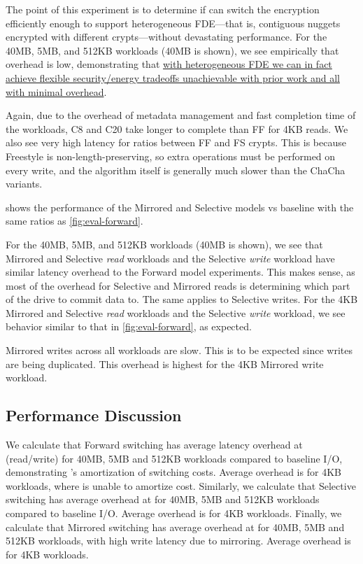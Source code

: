 

The point of this experiment is to determine if \sys can switch the encryption
efficiently enough to support heterogeneous FDE---that is, contiguous nuggets
encrypted with different crypts---without devastating performance. For the 40MB,
5MB, and 512KB workloads (40MB is shown), we see empirically that overhead is
low, demonstrating that \uline{with heterogeneous FDE we can in fact achieve
flexible security/energy tradeoffs unachievable with prior work and all with
minimal overhead}.

Again, due to the overhead of metadata management and fast completion time of
the workloads, C8 and C20 take longer to complete than FF for 4KB reads. We also
see very high latency for ratios between FF and FS crypts. This is because
Freestyle is non-length-preserving, so extra operations must be performed on
every write, and the algorithm itself is generally much slower than the ChaCha
variants.

 shows the performance of the Mirrored and Selective models vs
baseline with the same ratios as \cref{fig:eval-forward}.

For the 40MB, 5MB, and 512KB workloads (40MB is shown), we see that Mirrored and
Selective {\em read} workloads and the Selective {\em write} workload have
similar latency overhead to the Forward model experiments. This makes sense, as
most of the overhead for Selective and Mirrored reads is determining which part
of the drive to commit data to. The same applies to Selective writes. For the
4KB Mirrored and Selective {\em read} workloads and the Selective {\em write}
workload, we see behavior similar to that in \cref{fig:eval-forward}, as
expected.

Mirrored writes across all workloads are slow. This is to be expected since
writes are being duplicated. This overhead is highest for the 4KB Mirrored write
workload.


\subsection{Performance Discussion}\label{subsec:eval-overhead}

We calculate that Forward switching has average latency overhead at
 (read/write) for 40MB, 5MB and 512KB workloads compared to
baseline I/O, demonstrating \sys's amortization of switching costs. Average
overhead is  for 4KB workloads, where \sys is unable to amortize
cost. Similarly, we calculate that Selective switching has average overhead at
 for 40MB, 5MB and 512KB workloads compared to baseline I/O.
Average overhead is  for 4KB workloads. Finally, we calculate that
Mirrored switching has average overhead at  for 40MB, 5MB and
512KB workloads, with high write latency due to mirroring. Average overhead is
 for 4KB workloads.

